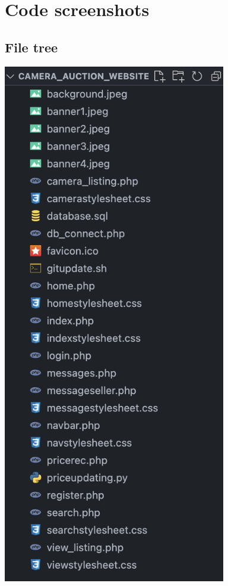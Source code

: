 \appendix
\chapter{Code screenshots}

\section*{File tree}

\includegraphics[width=3.83333in,height=9.01389in]{ch6_appendix/media/image1.png}

